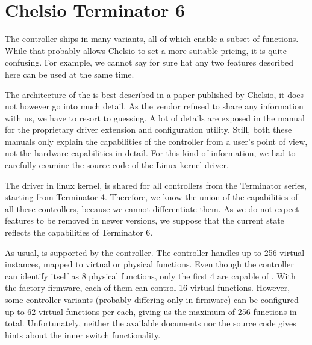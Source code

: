 \section{Chelsio Terminator 6}

% 
% 
% 
% 
% 
% 
% 
% 
% 
% 

The controller ships in many variants, all of which enable a subset of
functions. While that probably allows Chelsio to set a more suitable pricing,
it is quite confusing. For example, we cannot say for sure hat any two features
described here can be used at the same time.

The architecture of the  is best described in a paper published by
Chelsio\cite{chelsio-t6}, it does not however go into much detail. As the
vendor refused to share any information with us, we have to resort to guessing.
A lot of details are exposed in the manual for the proprietary driver extension
and configuration utility\cite{chelsio-uw}. Still, both these manuals only
explain the capabilities of the controller from a user's point of view, not the
hardware capabilities in detail. For this kind of information, we had to
carefully examine the source code of the Linux kernel driver.

The driver in linux kernel,  is shared for all controllers from the
Terminator series, starting from Terminator 4. Therefore, we know the union of
the capabilities of all these controllers, because we cannot differentiate
them. As we do not expect features to be removed in newer versions, we suppose
that the current state reflects the capabilities of Terminator 6.

As usual,  is supported by the controller. The controller handles up
to 256 virtual instances, mapped to virtual or physical functions. Even though
the controller can identify itself as 8 physical functions, only the first
4 are capable of . With the factory firmware, each of them can
control 16 virtual functions. However, some controller variants (probably
differing only in firmware) can be configured up to 62 virtual functions per
each, giving us the maximum of 256 functions in total. Unfortunately, neither
the available documents nor the source code gives hints about the inner switch
functionality.

